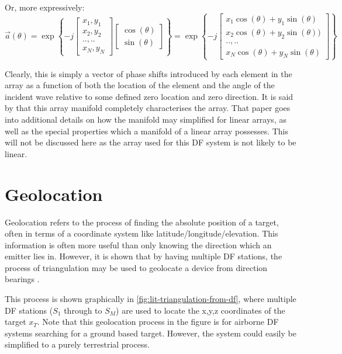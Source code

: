 Or, more expressively:
\begin{equation}
\vec{a}(\theta) = \exp \left\{ -j \begin{bmatrix} x_1, y_1 \\ x_2, y_2 \\ .., .. \\ x_N, y_N \end{bmatrix} \begin{bmatrix} \cos(\theta) \\ \sin(\theta) \end{bmatrix} \right\}
= \exp \left\{ -j \begin{bmatrix} x_1\cos(\theta) + y_1\sin(\theta) \\ x_2\cos(\theta) + y_2\sin(\theta)) \\ .., .. \\ x_N\cos(\theta) + y_N\sin(\theta) \end{bmatrix} \right\}
\end{equation}

Clearly, this is simply a vector of phase shifts introduced by each element in the array as a function of both the location of the element and the angle of the incident wave relative to some defined zero location and zero direction. It is said by \cite{dacos1995estimating} that this array manifold completely characterises the array. That paper goes into additional details on how the manifold may simplified for linear arrays, as well as the special properties which a manifold of a linear array possesses. This will not be discussed here as the array used for this DF system is not likely to be linear. 

\section{Geolocation}
Geolocation refers to the process of finding the absolute position of a target, often in terms of a coordinate system like latitude/longitude/elevation. This information is often more useful than only knowing the direction which an emitter lies in. However, it is shown that by having multiple DF stations, the process of triangulation may be used to geolocate a device from direction bearings \cite{poisel2012electronic}. 

This process is shown graphically in \autoref{fig:lit-triangulation-from-df}, where multiple DF stations ($S_{1}$ through to $S_{M}$) are used to locate the x,y,z coordinates of the target $x_{T}$. Note that this geolocation process in the figure is for airborne DF systems searching for a ground based target. However, the system could easily be simplified to a purely terrestrial process.

